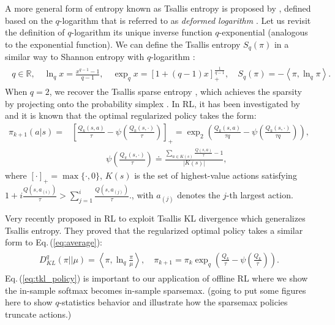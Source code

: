 \documentclass{article}
\newcommand{\AdaBracket}[1]{\left(#1\right)}
\newcommand{\AdaRectBracket}[1]{\left[#1\right]}
\newcommand{\AdaAngleProduct}[2]{\left\langle#1, #2\right\rangle}
\newcommand{\qlog}{$q$-logarithm }
\newcommand{\tsallis}[1]{S_q(#1)}
\newcommand{\qKLany}[2]{D^{q}_{\!K\!L}\!\left(#1 \left|  \right| #2 \right)}
\newcommand{\logq}[1]{\ln_{q}\!#1}
\newcommand{\expq}[1]{\exp_{q}\!#1}
\newcommand{\eq}[1]{Eq.\,(#1)}
\begin{document}
A more general form of entropy known as Tsallis entropy is proposed by \cite{TsallisEntropy},  defined based on the \qlog that is referred to as \emph{deformed logarithm} \cite{tsallis2009introduction}.
Let us revisit the definition of \qlog its unique inverse function $q$-exponential (analogous to the exponential function).
We can define the Tsallis entropy $S_q(\pi)$ in a similar way to Shannon entropy with \qlog:
\begin{align}
    \begin{split}
        q \in  \mathbb{R}, \quad \logq{x} = \frac{x^{q-1} - 1}{q-1}, \quad \expq{x} = \AdaRectBracket{1 + (q - 1)x}^{\frac{1}{q-1}}_{+},\quad \tsallis{\pi} = -\AdaAngleProduct{\pi}{\logq{\pi}}.
    \end{split}
\end{align}
When $q=2$, we recover the Tsallis sparse entropy \cite{Martins16-sparsemax}, which achieves the sparsity by projecting onto the probability simplex \cite{Blondel-2020LearningFenchelYoundLoss}.
In RL, it has been investigated by \cite{Lee2018-TsallisRAL,Lee2020-generalTsallisRSS} and it is known that the optimal regularized policy takes the form:
\begin{align*}
    \pi_{k+1}(a|s) = &\AdaRectBracket{\frac{Q_k(s,a)}{\tau} - \psi\AdaBracket{\frac{Q_k(s, \cdot)}{\tau}}}_{+} = \exp_2 \AdaBracket{\frac{Q_k(s,a)}{\tau q} - \psi\AdaBracket{\frac{Q_k(s, \cdot)}{\tau q}}}, \\
    &\qquad \qquad \psi\AdaBracket{\frac{Q_{\pi}(s,\cdot)}{\tau}} \doteq \frac{\sum_{a\in K(s)} \frac{Q(s,a)}{\tau} - 1 }{|K{(s)}|},
\end{align*}
where $[\cdot]_{+} = \max \{\cdot, 0\}$,  $K(s)$ is the set of highest-value actions satisfying $1 \!+\! i\frac{Q(s,a_{(i)})}{\tau} \!>\! \sum_{j=1}^{i}\frac{Q(s,a_{(j)})}{\tau}$., with $a_{(j)}$ denotes the $j$-th largest action.

Very recently \citet{zhu2023generalized} proposed in RL to exploit Tsallis KL divergence which generalizes Tsallis entropy.  
They proved that the regularized optimal policy takes a similar form to \eq{\ref{eq:average}}:
\begin{align}
    \begin{split}
        \qKLany{\pi}{\mu} = \AdaAngleProduct{\pi}{\logq{\frac{\pi}{\mu}}}, \quad \pi_{k+1} = \pi_{k} \exp_q\AdaBracket{\frac{Q_k}{\tau} - \psi\AdaBracket{\frac{Q_k}{\tau}} }.
    \end{split}
    \label{eq:tkl_policy}
\end{align}
\eq{\ref{eq:tkl_policy}} is important to our application of offline RL where we show the in-sample softmax becomes in-sample sparsemax.
{\color{red} (going to put some figures here to show $q$-statistics behavior and illustrate how the sparsemax policies truncate actions.)}
\end{document}
